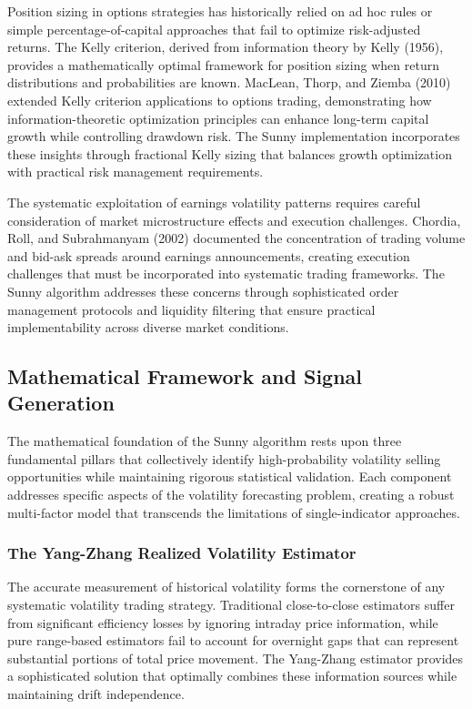 \documentclass[
  american,
  11pt,
  11pt,
  letterpaper,
  onecolumn]{article}
\begin{document}
Position sizing in options strategies has historically relied on ad hoc
rules or simple percentage-of-capital approaches that fail to optimize
risk-adjusted returns. The Kelly criterion, derived from information
theory by Kelly (1956), provides a mathematically optimal framework for
position sizing when return distributions and probabilities are known.
MacLean, Thorp, and Ziemba (2010) extended Kelly criterion applications
to options trading, demonstrating how information-theoretic optimization
principles can enhance long-term capital growth while controlling
drawdown risk. The Sunny implementation incorporates these insights
through fractional Kelly sizing that balances growth optimization with
practical risk management requirements.

The systematic exploitation of earnings volatility patterns requires
careful consideration of market microstructure effects and execution
challenges. Chordia, Roll, and Subrahmanyam (2002) documented the
concentration of trading volume and bid-ask spreads around earnings
announcements, creating execution challenges that must be incorporated
into systematic trading frameworks. The Sunny algorithm addresses these
concerns through sophisticated order management protocols and liquidity
filtering that ensure practical implementability across diverse market
conditions.

\subsection{Mathematical Framework and Signal
Generation}\label{mathematical-framework-and-signal-generation}

The mathematical foundation of the Sunny algorithm rests upon three
fundamental pillars that collectively identify high-probability
volatility selling opportunities while maintaining rigorous statistical
validation. Each component addresses specific aspects of the volatility
forecasting problem, creating a robust multi-factor model that
transcends the limitations of single-indicator approaches.

\subsubsection{The Yang-Zhang Realized Volatility
Estimator}\label{the-yang-zhang-realized-volatility-estimator}

The accurate measurement of historical volatility forms the cornerstone
of any systematic volatility trading strategy. Traditional
close-to-close estimators suffer from significant efficiency losses by
ignoring intraday price information, while pure range-based estimators
fail to account for overnight gaps that can represent substantial
portions of total price movement. The Yang-Zhang estimator provides a
sophisticated solution that optimally combines these information sources
while maintaining drift independence.
\end{document}
